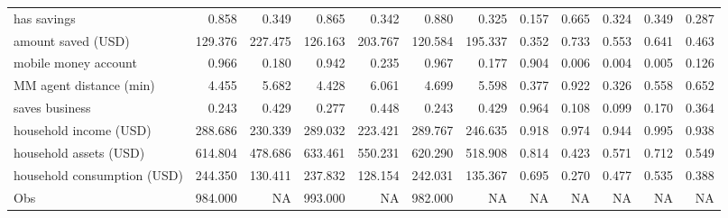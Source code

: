 \begin{tabular}{lrrrrrrrrrrr}
has savings & 0.858 & 0.349 & 0.865 & 0.342 & 0.880 & 0.325 & 0.157 & 0.665 & 0.324 & 0.349 & 0.287\\
amount saved (USD) & 129.376 & 227.475 & 126.163 & 203.767 & 120.584 & 195.337 & 0.352 & 0.733 & 0.553 & 0.641 & 0.463\\
\addlinespace
mobile money account & 0.966 & 0.180 & 0.942 & 0.235 & 0.967 & 0.177 & 0.904 & 0.006 & 0.004 & 0.005 & 0.126\\
MM agent distance (min) & 4.455 & 5.682 & 4.428 & 6.061 & 4.699 & 5.598 & 0.377 & 0.922 & 0.326 & 0.558 & 0.652\\
saves business & 0.243 & 0.429 & 0.277 & 0.448 & 0.243 & 0.429 & 0.964 & 0.108 & 0.099 & 0.170 & 0.364\\
household income (USD) & 288.686 & 230.339 & 289.032 & 223.421 & 289.767 & 246.635 & 0.918 & 0.974 & 0.944 & 0.995 & 0.938\\
household assets (USD) & 614.804 & 478.686 & 633.461 & 550.231 & 620.290 & 518.908 & 0.814 & 0.423 & 0.571 & 0.712 & 0.549\\
\addlinespace
household consumption (USD) & 244.350 & 130.411 & 237.832 & 128.154 & 242.031 & 135.367 & 0.695 & 0.270 & 0.477 & 0.535 & 0.388\\
Obs & 984.000 & NA & 993.000 & NA & 982.000 & NA & NA & NA & NA & NA & NA\\
\bottomrule
\end{tabular}
